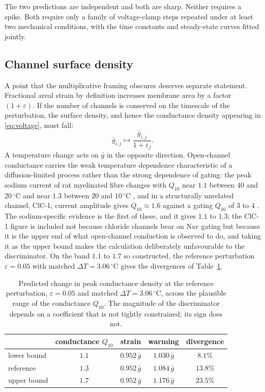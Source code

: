 The two predictions are independent and both are sharp. Neither requires a
spike. Both require only a family of voltage-clamp steps repeated under at least
two mechanical conditions, with the time constants and steady-state curves fitted
jointly.

\subsection{Channel surface density}
\label{sec:density}

A point that the multiplicative framing obscures deserves separate statement.
Fractional areal strain by definition increases membrane area by a factor
$(1+\varepsilon)$. If the number of channels is conserved on the timescale of the
perturbation, the surface density, and hence the conductance density appearing in
\eqref{eq:voltage}, must fall:
\begin{equation}
\bar g_{i,j}\longmapsto \frac{\bar g_{i,j}}{1+\varepsilon_j}.
\label{eq:dilution}
\end{equation}
A temperature change acts on $\bar g$ in the opposite direction. Open-channel
conductance carries the weak temperature dependence characteristic of a
diffusion-limited process rather than the strong dependence of gating: the
peak sodium current of rat myelinated fibre changes with $Q_{10}$ near $1.1$ between
$40$ and $20\,^{\circ}$C and near $1.3$ between $20$ and $10\,^{\circ}$C
\citep{schwarz1986}, and in a structurally unrelated channel, ClC-1, current
amplitude gives $Q_{10}\approx 1.6$ against a gating $Q_{10}$ of $3$ to $4$
\citep{bennetts2001}. The sodium-specific evidence is the first of these, and it gives $1.1$ to
$1.3$; the ClC-1 figure is included not because chloride channels bear on Nav
gating but because it is the upper end of what open-channel conduction is
observed to do, and taking it as the upper bound makes the calculation
deliberately unfavourable to the discriminator. On the band $1.1$ to $1.7$ so
constructed, the reference perturbation $\varepsilon=0.05$ with matched $\Delta T=3.06\,^{\circ}$C gives the
divergences of Table~\ref{tab:density}.

\begin{table}[ht]
\centering
\caption{Predicted change in peak conductance density at the reference
perturbation, $\varepsilon=0.05$ and matched $\Delta T=3.06\,^{\circ}$C, across
the plausible range of the conductance $Q_{10}$. The magnitude of the
discriminator depends on a coefficient that is not tightly constrained; its sign
does not.}
\label{tab:density}
\begin{tabular}{lcccc}
\toprule
 & conductance $Q_{10}$ & strain & warming & divergence \\
\midrule
lower bound & $1.1$ & $0.952\,\bar g$ & $1.030\,\bar g$ & $8.1\%$ \\
reference   & $1.3$ & $0.952\,\bar g$ & $1.084\,\bar g$ & $13.8\%$ \\
upper bound & $1.7$ & $0.952\,\bar g$ & $1.176\,\bar g$ & $23.5\%$ \\
\bottomrule
\end{tabular}
\end{table}

